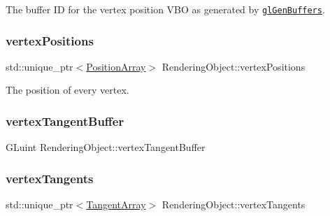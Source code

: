 The buffer ID for the vertex position V\+BO as generated by \href{https://www.opengl.org/sdk/docs/man/html/glGenBuffers.xhtml}{\tt gl\+Gen\+Buffers}. 

\hypertarget{class_rendering_object_a14721712672d0421ed72a394e3131da0}{}\label{class_rendering_object_a14721712672d0421ed72a394e3131da0} 
\subsubsection{\texorpdfstring{vertex\+Positions}{vertexPositions}}
{\footnotesize\ttfamily std\+::unique\+\_\+ptr$<$\hyperlink{class_rendering_object_a1223b9cf03f2029b9c43d71042c2a18e}{Position\+Array}$>$ Rendering\+Object\+::vertex\+Positions\hspace{0.3cm}{\ttfamily [protected]}}



The position of every vertex. 

\hypertarget{class_rendering_object_a0eac563be6e35a3cc4409d43a2abaa04}{}\label{class_rendering_object_a0eac563be6e35a3cc4409d43a2abaa04} 
\subsubsection{\texorpdfstring{vertex\+Tangent\+Buffer}{vertexTangentBuffer}}
{\footnotesize\ttfamily G\+Luint Rendering\+Object\+::vertex\+Tangent\+Buffer\hspace{0.3cm}{\ttfamily [protected]}}

\hypertarget{class_rendering_object_a7bca44786929dd3aca3d6ca1acc7597f}{}\label{class_rendering_object_a7bca44786929dd3aca3d6ca1acc7597f} 
\subsubsection{\texorpdfstring{vertex\+Tangents}{vertexTangents}}
{\footnotesize\ttfamily std\+::unique\+\_\+ptr$<$\hyperlink{class_rendering_object_a45b53e911c2f0131aa10e89869d38944}{Tangent\+Array}$>$ Rendering\+Object\+::vertex\+Tangents\hspace{0.3cm}{\ttfamily [protected]}}

